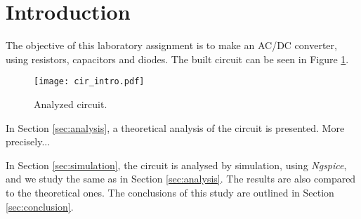 \section{Introduction}
\label{sec:introduction}

The objective of this laboratory assignment is to make an AC/DC converter, using resistors, capacitors and diodes. The built circuit can be seen in Figure \ref{fig:cir_intro}.

\begin{figure}[H] \centering
\texttt{[image: cir\_intro.pdf]}
\caption{Analyzed circuit.}
\label{fig:cir_intro}
\end{figure}

In Section \ref{sec:analysis}, a theoretical analysis of the circuit is
presented. More precisely...

In Section \ref{sec:simulation}, the circuit is analysed by
simulation, using \textit{Ngspice}, and we study the same as in Section \ref{sec:analysis}. The results are also compared to the theoretical ones. The conclusions of this study are outlined in Section \ref{sec:conclusion}.
